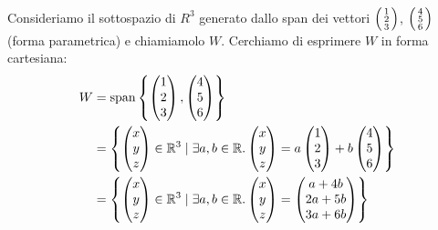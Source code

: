 \begin{example}
    Consideriamo il sottospazio di $R^3$ generato dallo span dei vettori $\begin{psmallmatrix} 1 \\ 2 \\ 3 \end{psmallmatrix}$, $\begin{psmallmatrix} 4 \\ 5 \\ 6 \end{psmallmatrix}$ (forma parametrica) e chiamiamolo $W$.
    Cerchiamo di esprimere $W$ in forma cartesiana: \begin{alignat*}{1}
        W &= \Span{\begin{pmatrix} 1 \\ 2 \\ 3 \end{pmatrix}, \begin{pmatrix} 4 \\ 5 \\ 6 \end{pmatrix}} \\
            &= \left\{ \begin{pmatrix} x \\ y \\ z \end{pmatrix} \in \R^3 \mid \exists a, b \in \R. \begin{pmatrix} x \\ y \\ z \end{pmatrix} = a\begin{pmatrix} 1 \\ 2 \\ 3 \end{pmatrix} + b\begin{pmatrix} 4 \\ 5 \\ 6 \end{pmatrix} \right\}\\
            &= \left\{ \begin{pmatrix} x \\ y \\ z \end{pmatrix} \in \R^3 \mid \exists a, b \in \R. \begin{pmatrix} x \\ y \\ z \end{pmatrix} = \begin{pmatrix} a + 4b \\ 2a+5b \\ 3a+6b \end{pmatrix}\right\}\\

\end{alignat*}
\end{example}
